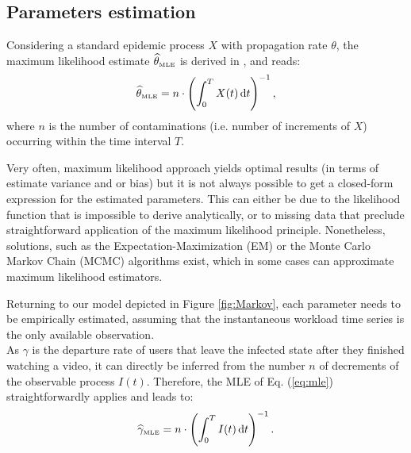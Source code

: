 \documentclass[twoside]{article}
\newcommand{\roy}[2]{#2}
\begin{document}
\subsection{Parameters estimation}
\label{sec:est_method}

Considering a standard epidemic process $X$ with propagation rate $\theta$, the maximum likelihood estimate $\widehat{\theta}_{\scriptscriptstyle \rm MLE}$ is derived in \cite{BarDynaPro2008}, \cite{AndStoEpi2000} and reads:
\begin{equation}
\widehat{\theta}_{\scriptscriptstyle\rm MLE} =  n \cdot \left( \int_0^T X(t) \,\mathrm{d}t\right)^{-1},
 \label{eq:mle}
\end{equation}
where $n$ is the number of contaminations (i.e. number of increments of $X$) occurring within the time interval $T$.

Very often, maximum likelihood approach yields optimal results (in terms of estimate variance and or bias) but it is not always possible to get a closed-form expression for the estimated parameters. This can either be due to the likelihood function that is impossible to derive analytically, or to missing data that preclude straightforward application of the maximum likelihood principle. Nonetheless, solutions, such as the Expectation-Maximization (EM) or the Monte Carlo Markov Chain (MCMC) algorithms exist, which in some cases can approximate maximum likelihood estimators. 

Returning to our model depicted in Figure \ref{fig:Markov}, each parameter needs to be empirically estimated, assuming that the instantaneous workload time series is the only available observation.\\

 As $\gamma$ is the departure rate of users that leave the infected state after they finished watching a video, it can directly be inferred from the number $n$ of decrements of the observable process $I(t)$. Therefore,  the MLE  of \roy{equation}{Eq.} (\ref{eq:mle}) straightforwardly applies and leads to:
\begin{equation}
\widehat{\gamma}_{\scriptscriptstyle\rm MLE} =  n \cdot \left( \int_0^T I(t) \,\mathrm{d}t\right)^{-1}.
 \label{eq:gamma}
\end{equation}
 
\end{document}
